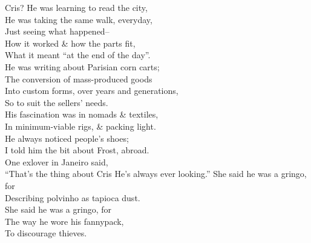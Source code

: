 Cris? He was learning to read the city, \\
He was taking the same walk, everyday, \\
Just seeing what happened-- \\
How it worked \& how the parts fit, \\
What it meant ``at the end of the day''. \\
He was writing about Parisian corn carts; \\
The conversion of mass-produced goods \\
Into custom forms, over years and generations, \\
So to suit the sellers' needs. \\
His fascination was in nomads \& textiles, \\
In minimum-viable rigs, \& packing light. \\
He always noticed people's shoes; \\
I told him the bit about Frost, abroad. \\
One exlover in Janeiro said, \\
\qquad ``That's the thing about Cris
\qquad He's always ever looking.''
She said he was a gringo, for \\
Describing polvinho as tapioca dust. \\
She said he was a gringo, for \\
The way he wore his fannypack, \\
To discourage thieves.